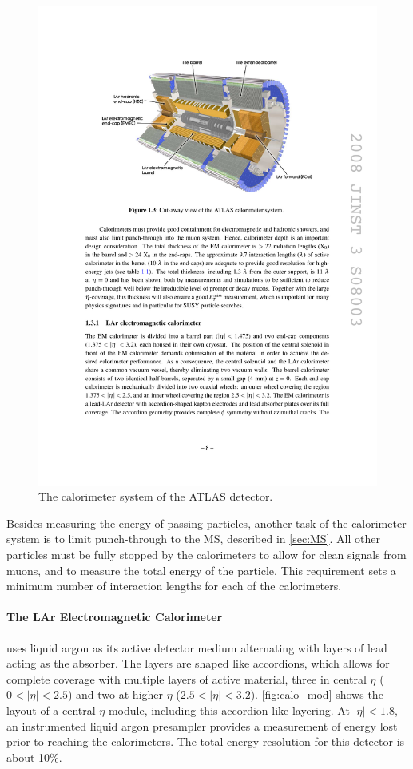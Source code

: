 \begin{centering}
\begin{figure}[bth]
\myfloatalign
\includegraphics[width=.90\linewidth]{figures/atlas/calorimeters.pdf}
\caption{The calorimeter system of the ATLAS detector.}
\label{fig:calo}
\end{figure}
\end{centering}

Besides measuring the energy of passing particles, another task of the calorimeter system is to limit punch-through to the \ac{MS}, described in \autoref{sec:MS}. All other particles must be fully stopped by the calorimeters to allow for clean signals from muons, and to measure the total energy of the particle. This requirement sets a minimum number of interaction lengths for each of the calorimeters. 

\paragraph{The LAr Electromagnetic Calorimeter} uses liquid argon as its active detector medium alternating with layers of lead acting as the absorber. The layers are shaped like accordions, which allows for complete coverage with multiple layers of active material, three in central $\eta$ ($0<|\eta|<2.5$) and two at higher $\eta$ ($2.5 < |\eta| < 3.2$). \autoref{fig:calo_mod} shows the layout of a central $\eta$ module, including this accordion-like layering. At $|\eta| < 1.8$, an instrumented liquid argon presampler provides a measurement of energy lost prior to reaching the calorimeters. The total energy resolution for this detector is about 10\%. 

